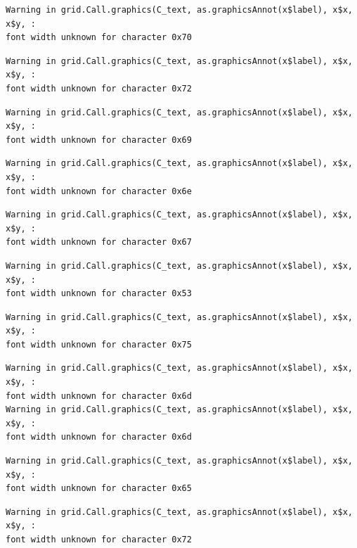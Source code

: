 \documentclass[
  letterpaper,
]{scrbook}
\begin{document}
\begin{verbatim}
Warning in grid.Call.graphics(C_text, as.graphicsAnnot(x$label), x$x, x$y, :
font width unknown for character 0x70
\end{verbatim}

\begin{verbatim}
Warning in grid.Call.graphics(C_text, as.graphicsAnnot(x$label), x$x, x$y, :
font width unknown for character 0x72
\end{verbatim}

\begin{verbatim}
Warning in grid.Call.graphics(C_text, as.graphicsAnnot(x$label), x$x, x$y, :
font width unknown for character 0x69
\end{verbatim}

\begin{verbatim}
Warning in grid.Call.graphics(C_text, as.graphicsAnnot(x$label), x$x, x$y, :
font width unknown for character 0x6e
\end{verbatim}

\begin{verbatim}
Warning in grid.Call.graphics(C_text, as.graphicsAnnot(x$label), x$x, x$y, :
font width unknown for character 0x67
\end{verbatim}

\begin{verbatim}
Warning in grid.Call.graphics(C_text, as.graphicsAnnot(x$label), x$x, x$y, :
font width unknown for character 0x53
\end{verbatim}

\begin{verbatim}
Warning in grid.Call.graphics(C_text, as.graphicsAnnot(x$label), x$x, x$y, :
font width unknown for character 0x75
\end{verbatim}

\begin{verbatim}
Warning in grid.Call.graphics(C_text, as.graphicsAnnot(x$label), x$x, x$y, :
font width unknown for character 0x6d
Warning in grid.Call.graphics(C_text, as.graphicsAnnot(x$label), x$x, x$y, :
font width unknown for character 0x6d
\end{verbatim}

\begin{verbatim}
Warning in grid.Call.graphics(C_text, as.graphicsAnnot(x$label), x$x, x$y, :
font width unknown for character 0x65
\end{verbatim}

\begin{verbatim}
Warning in grid.Call.graphics(C_text, as.graphicsAnnot(x$label), x$x, x$y, :
font width unknown for character 0x72
\end{verbatim}
\end{document}
